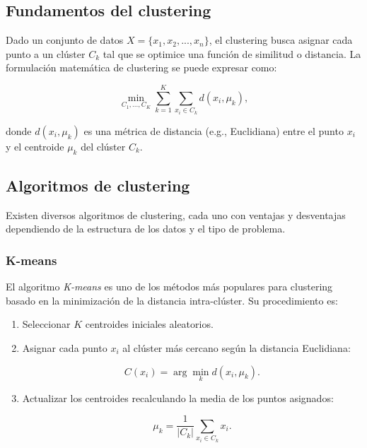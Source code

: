 \begin{itemize}
		\subsection{Fundamentos del clustering}
		
		Dado un conjunto de datos \( X = \{x_1, x_2, ..., x_n\} \), el clustering busca asignar cada punto a un clúster \( C_k \) tal que se optimice una función de similitud o distancia. La formulación matemática de clustering se puede expresar como:
		
		\begin{equation}
			\min_{C_1, ..., C_K} \sum_{k=1}^{K} \sum_{x_i \in C_k} d(x_i, \mu_k),
		\end{equation}
		
		donde \( d(x_i, \mu_k) \) es una métrica de distancia (e.g., Euclidiana) entre el punto \( x_i \) y el centroide \( \mu_k \) del clúster \( C_k \).
		
		\subsection{Algoritmos de clustering}
		
		Existen diversos algoritmos de clustering, cada uno con ventajas y desventajas dependiendo de la estructura de los datos y el tipo de problema.
		
		\subsubsection{K-means}
		
		El algoritmo \textit{K-means} es uno de los métodos más populares para clustering basado en la minimización de la distancia intra-clúster. Su procedimiento es:
		
		\begin{enumerate}
			\item Seleccionar \( K \) centroides iniciales aleatorios.
			\item Asignar cada punto \( x_i \) al clúster más cercano según la distancia Euclidiana:
			
			\begin{equation}
				C(x_i) = \arg \min_k d(x_i, \mu_k).
			\end{equation}
			
			\item Actualizar los centroides recalculando la media de los puntos asignados:
			
			\begin{equation}
				\mu_k = \frac{1}{|C_k|} \sum_{x_i \in C_k} x_i.
			\end{equation}
			

\end{enumerate}
\end{itemize}
